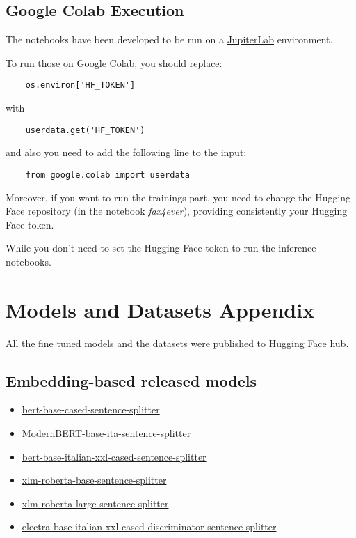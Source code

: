 \documentclass[11pt]{article}
\begin{document}
\subsection{Google Colab Execution}

The notebooks have been developed to be run on a \href{https://jupyterlab.readthedocs.io/en/latest/#}{JupiterLab}
environment. 

To run those on  Google Colab, you should replace:

\begin{verbatim}
	os.environ['HF_TOKEN']
\end{verbatim}

with

\begin{verbatim}
	userdata.get('HF_TOKEN')
\end{verbatim}

and also you need to add the following line to the input:

\begin{verbatim}
	from google.colab import userdata
\end{verbatim}

Moreover, if you want to run the trainings part, you need to change 
the Hugging Face repository (in the notebook \emph{fax4ever}),
providing consistently your Hugging Face token.

While you don't need to set the Hugging Face token to
run the inference notebooks.

\section{Models and Datasets Appendix}
\label{sec:appendix3}

All the fine tuned models and the datasets were published to Hugging Face 
hub.

\subsection{Embedding-based released models}

 \begin{itemize}
	\item \href{https://huggingface.co/fax4ever/bert-base-cased-sentence-splitter}{bert-base-cased-sentence-splitter}
	\item \href{https://huggingface.co/fax4ever/ModernBERT-base-ita-sentence-splitter}{ModernBERT-base-ita-sentence-splitter}
	\item \href{https://huggingface.co/fax4ever/bert-base-italian-xxl-cased-sentence-splitter}{bert-base-italian-xxl-cased-sentence-splitter}
	\item \href{https://huggingface.co/fax4ever/xlm-roberta-base-sentence-splitter}{xlm-roberta-base-sentence-splitter}
	\item \href{https://huggingface.co/fax4ever/xlm-roberta-large-sentence-splitter}{xlm-roberta-large-sentence-splitter}
	\item \href{https://huggingface.co/fax4ever/electra-base-italian-xxl-cased-discriminator-sentence-splitter}{electra-base-italian-xxl-cased-discriminator-sentence-splitter}
\end{itemize}
\end{document}
